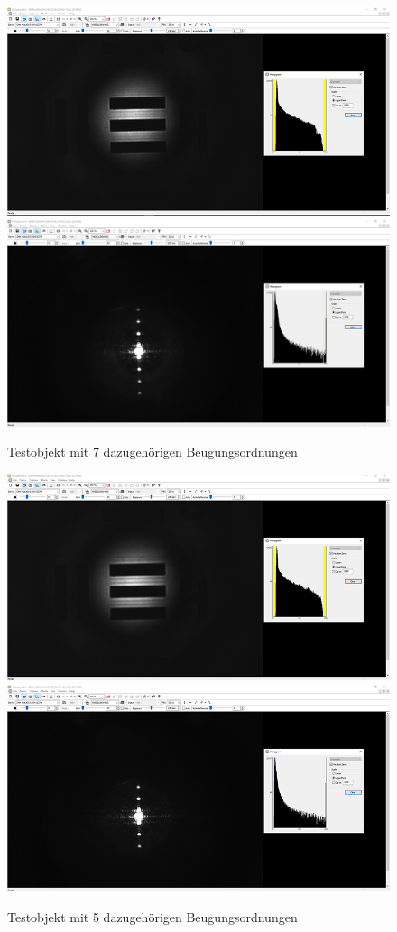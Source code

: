 \documentclass[12pt,a4paper,twoside]{article}
\begin{document}
\begin{figure}[H]
    \centering
    \includegraphics[width=0.45\linewidth]{nudes/AbbeTheorie/Aufgabe 2/horizontal/7te ohne.PNG}
    \includegraphics[width=0.45\linewidth]{nudes/AbbeTheorie/Aufgabe 2/horizontal/7te mit.PNG}
    \caption{Testobjekt mit 7 dazugehörigen Beugungsordnungen}
    \label{fig:Aufabe2-7O}
\end{figure}

\begin{figure}[H]
    \centering
    \includegraphics[width=0.45\linewidth]{nudes/AbbeTheorie/Aufgabe 2/horizontal/5te ohne.PNG}
    \includegraphics[width=0.45\linewidth]{nudes/AbbeTheorie/Aufgabe 2/horizontal/5te mit.PNG}
    \caption{Testobjekt mit 5 dazugehörigen Beugungsordnungen}
    \label{fig:Aufabe2-5O}
\end{figure}
\end{document}
